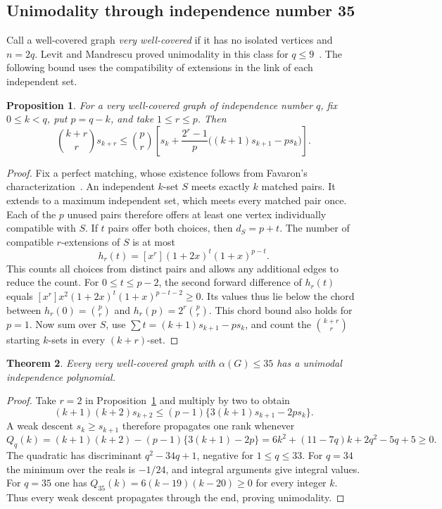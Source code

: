\documentclass[11pt,a4paper]{article}
\newtheorem{theorem}{Theorem}[section]
\newtheorem{proposition}[theorem]{Proposition}
\theoremstyle{remark}\newtheorem{remark}[theorem]{Remark}
\numberwithin{equation}{section}
\begin{document}
\subsection{Unimodality through independence number 35}
Call a well-covered graph \emph{very well-covered} if it has no isolated
vertices and $n=2q$. Levit and Mandrescu proved unimodality in this class
for $q\le9$~\cite{LMvery}. The following bound uses the compatibility of
extensions in the link of each independent set.
\begin{proposition}\label{prop:manyrank}
For a very well-covered graph of independence number $q$, fix
$0\le k<q$, put $p=q-k$, and take $1\le r\le p$. Then
\[
 \binom{k+r}{r}s_{k+r}\le
 \binom{p}{r}\left[s_k+
 \frac{2^r-1}{p}\big((k+1)s_{k+1}-p s_k\big)\right].
\]
\end{proposition}
\begin{proof}
Fix a perfect matching, whose existence follows from Favaron's
characterization~\cite{Favaron}. An independent $k$-set $S$ meets exactly
$k$ matched pairs. It extends to a maximum independent set, which meets
every matched pair once. Each of the $p$ unused pairs therefore offers at
least one vertex individually compatible with $S$. If $t$ pairs offer
both choices, then $d_S=p+t$. The number of compatible $r$-extensions
of $S$ is at most
\[
      h_r(t)=[x^r](1+2x)^t(1+x)^{p-t}.
\]
This counts all choices from distinct pairs and allows any additional
edges to reduce the count. For $0\le t\le p-2$, the second forward
difference of $h_r(t)$ equals
$[x^r]x^2(1+2x)^t(1+x)^{p-t-2}\ge0$. Its values thus lie below the
chord between $h_r(0)=\binom pr$ and $h_r(p)=2^r\binom pr$.
This chord bound also holds for $p=1$. Now sum over $S$, use
$\sum t=(k+1)s_{k+1}-p s_k$, and count the
$\binom{k+r}{r}$ starting $k$-sets in every $(k+r)$-set.
\end{proof}

\begin{theorem}\label{thm:very35}
Every very well-covered graph with $\alpha(G)\le35$ has a unimodal
independence polynomial.
\end{theorem}
\begin{proof}
Take $r=2$ in Proposition~\ref{prop:manyrank} and multiply by two to obtain
\[
 (k+1)(k+2)s_{k+2}
 \le(p-1)\{3(k+1)s_{k+1}-2p s_k\}.
\]
A weak descent $s_k\ge s_{k+1}$ therefore propagates one rank whenever
\[
 Q_q(k)=(k+1)(k+2)-(p-1)\{3(k+1)-2p\}
       =6k^2+(11-7q)k+2q^2-5q+5\ge0.
\]
The quadratic has discriminant $q^2-34q+1$, negative for $1\le q\le33$.
For $q=34$ the minimum over the reals is $-1/24$, and integral arguments
give integral values. For $q=35$ one has $Q_{35}(k)=6(k-19)(k-20)\ge0$
for every integer $k$. Thus every weak descent propagates through the
end, proving unimodality.
\end{proof}
\end{document}
